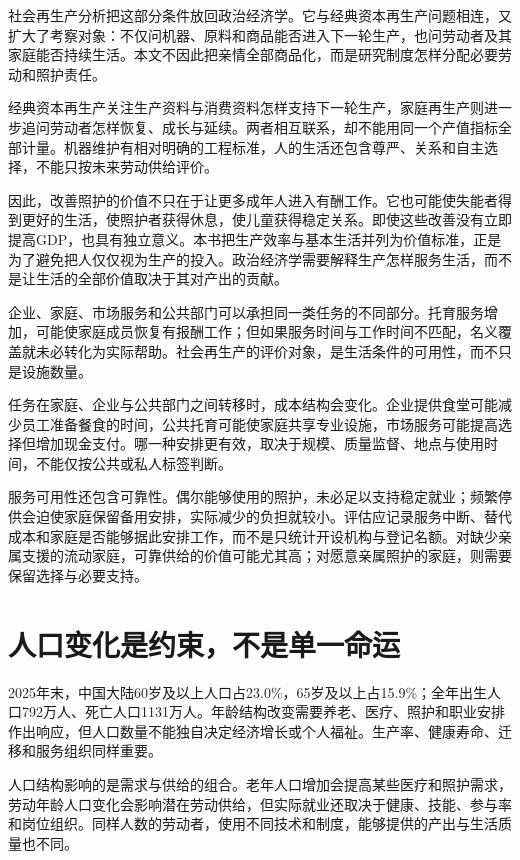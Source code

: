 \documentclass[UTF8,fontset=fandol,zihao=-4,oneside,openany]{ctexbook}
\begin{document}
社会再生产分析把这部分条件放回政治经济学。它与经典资本再生产问题相连，又扩大了考察对象：不仅问机器、原料和商品能否进入下一轮生产，也问劳动者及其家庭能否持续生活。本文不因此把亲情全部商品化，而是研究制度怎样分配必要劳动和照护责任。

\label{arg:P139}
经典资本再生产关注生产资料与消费资料怎样支持下一轮生产，家庭再生产则进一步追问劳动者怎样恢复、成长与延续。两者相互联系，却不能用同一个产值指标全部计量。机器维护有相对明确的工程标准，人的生活还包含尊严、关系和自主选择，不能只按未来劳动供给评价。

因此，改善照护的价值不只在于让更多成年人进入有酬工作。它也可能使失能者得到更好的生活，使照护者获得休息，使儿童获得稳定关系。即使这些改善没有立即提高GDP，也具有独立意义。本书把生产效率与基本生活并列为价值标准，正是为了避免把人仅仅视为生产的投入。政治经济学需要解释生产怎样服务生活，而不是让生活的全部价值取决于其对产出的贡献。

企业、家庭、市场服务和公共部门可以承担同一类任务的不同部分。托育服务增加，可能使家庭成员恢复有报酬工作；但如果服务时间与工作时间不匹配，名义覆盖就未必转化为实际帮助。社会再生产的评价对象，是生活条件的可用性，而不只是设施数量。

\label{arg:P140}
任务在家庭、企业与公共部门之间转移时，成本结构会变化。企业提供食堂可能减少员工准备餐食的时间，公共托育可能使家庭共享专业设施，市场服务可能提高选择但增加现金支付。哪一种安排更有效，取决于规模、质量监督、地点与使用时间，不能仅按公共或私人标签判断。

服务可用性还包含可靠性。偶尔能够使用的照护，未必足以支持稳定就业；频繁停供会迫使家庭保留备用安排，实际减少的负担就较小。评估应记录服务中断、替代成本和家庭是否能够据此安排工作，而不是只统计开设机构与登记名额。对缺少亲属支援的流动家庭，可靠供给的价值可能尤其高；对愿意亲属照护的家庭，则需要保留选择与必要支持。

\section{人口变化是约束，不是单一命运}
2025年末，中国大陆60岁及以上人口占23.0\%，65岁及以上占15.9\%；全年出生人口792万人、死亡人口1131万人。年龄结构改变需要养老、医疗、照护和职业安排作出响应，但人口数量不能独自决定经济增长或个人福祉。生产率、健康寿命、迁移和服务组织同样重要。\cite{NBS2025}

\label{arg:P141}
人口结构影响的是需求与供给的组合。老年人口增加会提高某些医疗和照护需求，劳动年龄人口变化会影响潜在劳动供给，但实际就业还取决于健康、技能、参与率和岗位组织。同样人数的劳动者，使用不同技术和制度，能够提供的产出与生活质量也不同。
\end{document}
